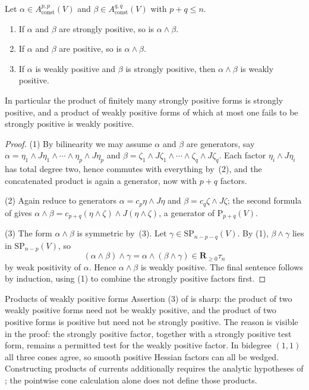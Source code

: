 \begin{proposition}
\label{prop:ch09-positivity-products}
Let $\alpha\in A_{\mathrm{const}}^{p,p}(V)$ and
$\beta\in A_{\mathrm{const}}^{q,q}(V)$ with $p+q\leq n$.
\begin{enumerate}
\item If $\alpha$ and $\beta$ are strongly positive, so is
  $\alpha\wedge\beta$.
\item If $\alpha$ and $\beta$ are positive, so is $\alpha\wedge\beta$.
\item If $\alpha$ is weakly positive and $\beta$ is strongly positive, then
  $\alpha\wedge\beta$ is weakly positive.
\end{enumerate}
In particular the product of finitely many strongly positive forms is
strongly positive, and a product of weakly positive forms of which at most
one fails to be strongly positive is weakly positive.
\end{proposition}

\begin{proof}
(1)  By bilinearity we may assume $\alpha$ and $\beta$ are generators, say
$\alpha=\eta_1\wedge J\eta_1\wedge\cdots\wedge\eta_p\wedge J\eta_p$ and
$\beta=\zeta_1\wedge J\zeta_1\wedge\cdots\wedge\zeta_q\wedge J\zeta_q$.  Each
factor $\eta_i\wedge J\eta_i$ has total degree two, hence commutes with
everything by \,(2), and the concatenated product
is again a generator, now with $p+q$ factors.

(2)  Again reduce to generators $\alpha=c_p\eta\wedge J\eta$ and
$\beta=c_q\zeta\wedge J\zeta$; the second formula of
 gives
$\alpha\wedge\beta=c_{p+q}(\eta\wedge\zeta)\wedge J(\eta\wedge\zeta)$, a
generator of $\mathrm{P}_{p+q}(V)$.

(3)  The form $\alpha\wedge\beta$ is symmetric by
\,(3).  Let
$\gamma\in\mathrm{SP}_{n-p-q}(V)$.  By (1), $\beta\wedge\gamma$ lies in
$\mathrm{SP}_{n-p}(V)$, so
\[
 (\alpha\wedge\beta)\wedge\gamma=\alpha\wedge(\beta\wedge\gamma)
 \in\mathbf R_{\geq0}\tau_n
\]
by weak positivity of $\alpha$.  Hence $\alpha\wedge\beta$ is weakly
positive.  The final sentence follows by induction, using (1) to combine the
strongly positive factors first.
\end{proof}

\begin{warning}{Products of weakly positive forms}
Assertion (3) of  is sharp: the product of
two weakly positive forms need not be weakly positive, and the product of two
positive forms is positive but need not be strongly positive.  The reason is
visible in the proof: the strongly positive factor, together with a
strongly positive test form, remains a permitted test for the weakly
positive factor.  In bidegree $(1,1)$ all three cones agree, so smooth
positive Hessian factors can all be wedged.  Constructing products of
currents additionally requires the analytic hypotheses of
; the pointwise cone calculation alone does
not define those products.
\end{warning}


